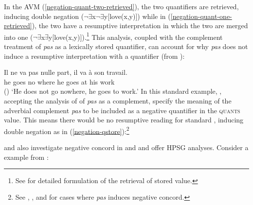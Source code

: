 \documentclass[output=paper
 	        ,biblatex
                ,babelshorthands
                ,newtxmath
                ,draftmode
                ,colorlinks, citecolor=brown
]{langscibook}
\begin{document}
\begin{exe}
\begin{xlist}
\begin{exe}
\begin{xlist}
\eal
\ex
\label{negation-quant-two-retrieved}
\ex
\label{negation-quant-one-retrieved}
\zl
%
%
\noindent
In the AVM (\ref{negation-quant-two-retrieved}), the two quantifiers are retrieved, inducing double negation ($\neg\exists$x$\neg\exists$y[love(x,y)]) while in (\ref{negation-quant-one-retrieved}), the two have a resumptive interpretation in which the two are merged into one ($\neg\exists$x$\exists$y[love(x,y)]).\footnote{See \citet{Swart:02} for detailed formulation of the retrieval of stored value.} This analysis, coupled with the complement treatment of \textit{pas} as a lexically stored quantifier, can account
for why \emph{pas} does not induce a resumptive interpretation with a quantifier (from
\citealt[]{Swart:02}):


\ea
\gll Il ne     va   pas    nulle part, il va   à  son travail.\\
     he \NEG{} goes \NEG{} no    where he goes at his work\\\hfill()
\glt `He does not go nowhere, he goes to work.'
\z
%
In this standard  example, \citet{Swart:02}, accepting
the analysis of \citet{Kim:00} of \textit{pas} as a complement,
specify the meaning of the adverbial complement \emph{pas} to be included as a negative quantifier in the \textsc{quants} value.
 This means there would be no resumptive
reading for standard , inducing double negation as in
(\ref{negation-qstore}):\footnote{See , ,
and  for cases where \textit{pas} induces negative concord.}

\ea
\label{negation-qstore}
\z

\citet{PK:99} and \citet{BJ:00} also  investigate negative concord in  and 
and offer HPSG analyses. Consider a  example from \citet[]{BJ:00}:


\end{xlist}
\end{exe}
\end{xlist}
\end{exe}
\end{document}
